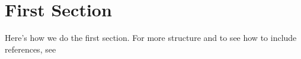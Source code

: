 \documentclass[../chapter01.tex]{subfile}
\begin{document}
\section[First Section]{First Section}\label{sec:First Section}

Here's how we do the first section. For more structure and to see how to include references, see \cite{qwinters2021repoTemplate}
\end{document}
